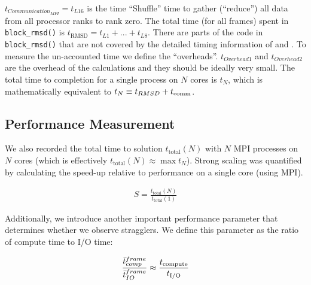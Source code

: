 $t_{Communication_{MPI}} = t_{L16}$ is the time ``Shuffle'' time to gather (``reduce'') all data from all processor ranks to rank zero.
The total time (for all frames) spent in \texttt{block\_rmsd()} is $t_{\text{RMSD}} = t_{L1} + ...+ t_{L8}$. 
There are parts of the code in \texttt{block\_rmsd()} that are not covered by the detailed timing information of \tcomp and \tIO. 
To measure the un-accounted time we define the ``overheads''.
$t_{Overhead1}$ and $t_{Overhead2}$ are the overhead of the calculations and they should be ideally very small.  
The total time to completion for a single process on $N$ cores is $t_{N}$, which is mathematically equivalent to
$t_{N} \equiv t_{RMSD} + t_{\text{comm}}$.

\subsection{Performance Measurement}
We also recorded the total time to solution $t_{\text{total}}(N)$ with $N$ MPI processes on $N$ cores (which is effectively
$t_{\text{total}}(N) \approx \max t_{N}$). 
Strong scaling was quantified by calculating the speed-up relative to performance on a single core (using MPI).

\begin{gather}
  \label{eq:speedup}
  S = \frac{t_{\text{total}}(N)}{t_{\text{total}}(1)}
\end{gather}

Additionally, we introduce another important performance parameter that determines whether we observe stragglers.
We define this parameter as the ratio of compute time to I/O time:

\begin{gather}
  \label{eq:Compute-I/O}
    \frac{\bar{t}_{comp}^{frame}}{\bar{t}_{IO}^{frame}} \approx \frac{{t}_{\text{compute}}}{{t}_{\text{I/O}}} 
 \end{gather}

